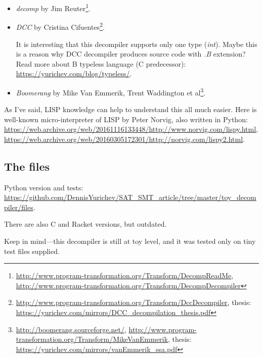 \begin{itemize}
	\item \textit{decomp} by Jim Reuter\footnote{
			\url{http://www.program-transformation.org/Transform/DecompReadMe},
			\url{http://www.program-transformation.org/Transform/DecompDecompiler}}.

	\item \textit{DCC} by Cristina Cifuentes\footnote{
			\url{http://www.program-transformation.org/Transform/DccDecompiler},
			thesis: \url{https://yurichev.com/mirrors/DCC_decompilation_thesis.pdf}}.

		It is interesting that this decompiler supports only one type (\textit{int}).
		Maybe this is a reason why DCC decompiler produces source code with \textit{.B} extension?
		Read more about B typeless language (C predecessor): \url{https://yurichev.com/blog/typeless/}.

	\item \textit{Boomerang} by Mike Van Emmerik, Trent Waddington et al\footnote{
			\url{http://boomerang.sourceforge.net/},
			\url{http://www.program-transformation.org/Transform/MikeVanEmmerik},
			thesis: \url{https://yurichev.com/mirrors/vanEmmerik_ssa.pdf}}.
\end{itemize}

As I've said, LISP knowledge can help to understand this all much easier.
Here is well-known micro-interpreter of LISP by Peter Norvig, also written in Python:
\url{https://web.archive.org/web/20161116133448/http://www.norvig.com/lispy.html},
\url{https://web.archive.org/web/20160305172301/http://norvig.com/lispy2.html}.

\subsection{The files}

Python version and tests: \url{https://github.com/DennisYurichev/SAT_SMT_article/tree/master/toy_decompiler/files}.

There are also C and Racket versions, but outdated.

Keep in mind---this decompiler is still at toy level, and it was tested only on tiny test files supplied.

